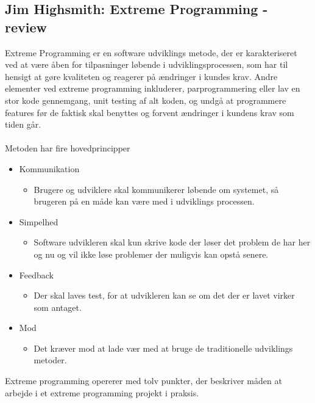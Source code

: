 \documentclass[12pt,a4paper]{article}
\begin{document}
\subsection{Jim Highsmith: Extreme Programming - review}
Extreme Programming er en software udviklings metode, der er karakteriseret ved at være åben for tilpasninger løbende i udviklingsprocessen, som har til hensigt at gøre kvaliteten og reagerer på ændringer i kundes krav. Andre elementer ved extreme programming inkluderer, parprogrammering eller lav en stor kode gennemgang, unit testing af alt koden, og undgå at programmere features før de faktisk skal benyttes og forvent ændringer i kundens krav som tiden går.
\\
\\
Metoden har fire hovedprincipper
\begin{itemize}
	\item Kommunikation
		\begin{itemize}
			\item Brugere og udviklere skal kommunikerer løbende om systemet, så brugeren på en måde kan være med i udviklings processen.
		\end{itemize}
	\item Simpelhed
		\begin{itemize}
			\item Software udvikleren skal kun skrive kode der løser det problem de har her og nu og vil ikke løse problemer der muligvis kan opstå senere.
		\end{itemize}
		\item Feedback
			\begin{itemize}
				\item Der skal laves test, for at udvikleren kan se om det der er lavet virker som antaget.
			\end{itemize}
		\item Mod
			\begin{itemize}
				\item Det kræver mod at lade vær med at bruge de traditionelle udviklings metoder.
			\end{itemize}
\end{itemize}
Extreme programming opererer med tolv punkter, der beskriver måden at arbejde i et extreme programming projekt i praksis.
\end{document}
